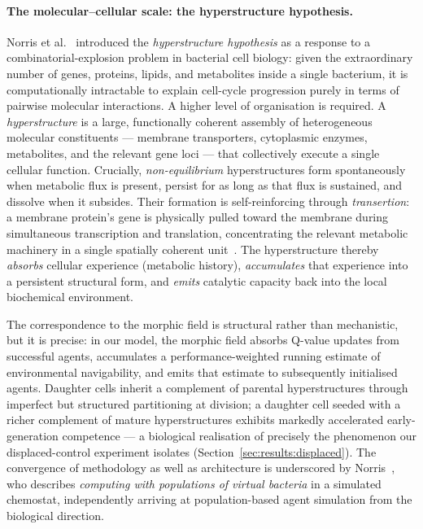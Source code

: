 \documentclass[twoside,11pt]{article}
\begin{document}
\paragraph{The molecular--cellular scale: the hyperstructure hypothesis.}
Norris et al.~\citep{norris1999} introduced the \emph{hyperstructure hypothesis}
as a response to a combinatorial-explosion problem in bacterial cell biology:
given the extraordinary number of genes, proteins, lipids, and metabolites
inside a single bacterium, it is computationally intractable to explain
cell-cycle progression purely in terms of pairwise molecular interactions.
A higher level of organisation is required.  A \emph{hyperstructure} is a
large, functionally coherent assembly of heterogeneous molecular constituents
--- membrane transporters, cytoplasmic enzymes, metabolites, and the relevant
gene loci --- that collectively execute a single cellular function.  Crucially,
\emph{non-equilibrium} hyperstructures form spontaneously when metabolic flux
is present, persist for as long as that flux is sustained, and dissolve when it
subsides.  Their formation is self-reinforcing through \emph{transertion}: a
membrane protein's gene is physically pulled toward the membrane during
simultaneous transcription and translation, concentrating the relevant metabolic
machinery in a single spatially coherent unit~\citep{norris1999,norris2007}.
The hyperstructure thereby \emph{absorbs} cellular experience (metabolic
history), \emph{accumulates} that experience into a persistent structural form,
and \emph{emits} catalytic capacity back into the local biochemical environment.

The correspondence to the morphic field is structural rather than mechanistic,
but it is precise: in our model, the morphic field absorbs Q-value updates from
successful agents, accumulates a performance-weighted running estimate of
environmental navigability, and emits that estimate to subsequently initialised
agents.  Daughter cells inherit a complement of parental hyperstructures through
imperfect but structured partitioning at division; a daughter cell seeded with a
richer complement of mature hyperstructures exhibits markedly accelerated
early-generation competence --- a biological realisation of precisely the
phenomenon our displaced-control experiment isolates
(Section~\ref{sec:results:displaced}).  The convergence of methodology as well
as architecture is underscored by Norris~\citep{norris2024}, who describes
\emph{computing with populations of virtual bacteria} in a simulated chemostat,
independently arriving at population-based agent simulation from the biological
direction.
\end{document}
